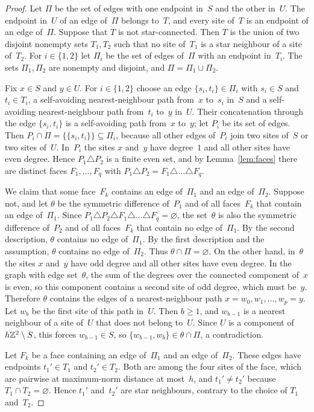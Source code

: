 \documentclass[11pt,letterpaper]{article}
\begin{document}
\begin{proof}
Let $\Pi$ be the set of edges with one endpoint in~$S$ and the other in~$U$. The endpoint in~$U$ of an edge of~$\Pi$ belongs to~$T$, and every site of~$T$ is an endpoint of an edge of~$\Pi$. Suppose that $T$ is not star-connected. Then $T$ is the union of two disjoint nonempty sets $T_1,T_2$ such that no site of~$T_1$ is a star neighbour of a site of~$T_2$. For $i\in\{1,2\}$ let $\Pi_i$ be the set of edges of~$\Pi$ with an endpoint in~$T_i$. The sets $\Pi_1,\Pi_2$ are nonempty and disjoint, and $\Pi=\Pi_1\cup\Pi_2$.

Fix $x\in S$ and $y\in U$. For $i\in\{1,2\}$ choose an edge $\{s_i,t_i\}\in\Pi_i$ with $s_i\in S$ and $t_i\in T_i$, a self-avoiding nearest-neighbour path from~$x$ to~$s_i$ in~$S$ and a self-avoiding nearest-neighbour path from~$t_i$ to~$y$ in~$U$. Their concatenation through the edge $\{s_i,t_i\}$ is a self-avoiding path from~$x$ to~$y$; let $P_i$ be its set of edges. Then $P_i\cap\Pi=\{\{s_i,t_i\}\}\subseteq\Pi_i$, because all other edges of~$P_i$ join two sites of~$S$ or two sites of~$U$. In~$P_i$ the sites $x$ and~$y$ have degree~$1$ and all other sites have even degree. Hence $P_1\triangle P_2$ is a finite even set, and by Lemma~\ref{lem:faces} there are distinct faces $F_1,\dots,F_q$ with $P_1\triangle P_2=F_1\triangle\dots\triangle F_q$.

We claim that some face~$F_k$ contains an edge of~$\Pi_1$ and an edge of~$\Pi_2$. Suppose not, and let $\theta$ be the symmetric difference of~$P_1$ and of all faces~$F_k$ that contain an edge of~$\Pi_1$. Since $P_1\triangle P_2\triangle F_1\triangle\dots\triangle F_q=\varnothing$, the set~$\theta$ is also the symmetric difference of~$P_2$ and of all faces~$F_k$ that contain no edge of~$\Pi_1$. By the second description, $\theta$ contains no edge of~$\Pi_1$. By the first description and the assumption, $\theta$ contains no edge of~$\Pi_2$. Thus $\theta\cap\Pi=\varnothing$. On the other hand, in~$\theta$ the sites $x$ and~$y$ have odd degree and all other sites have even degree. In the graph with edge set~$\theta$, the sum of the degrees over the connected component of~$x$ is even, so this component contains a second site of odd degree, which must be~$y$. Therefore $\theta$ contains the edges of a nearest-neighbour path $x=w_0,w_1,\dots,w_p=y$. Let $w_b$ be the first site of this path in~$U$. Then $b\ge1$, and $w_{b-1}$ is a nearest neighbour of a site of~$U$ that does not belong to~$U$. Since $U$ is a component of $h\mathbb Z^2\setminus S$, this forces $w_{b-1}\in S$, so $\{w_{b-1},w_b\}\in\theta\cap\Pi$, a contradiction.

Let $F_k$ be a face containing an edge of~$\Pi_1$ and an edge of~$\Pi_2$. These edges have endpoints $t_1'\in T_1$ and $t_2'\in T_2$. Both are among the four sites of the face, which are pairwise at maximum-norm distance at most~$h$, and $t_1'\neq t_2'$ because $T_1\cap T_2=\varnothing$. Hence $t_1'$ and~$t_2'$ are star neighbours, contrary to the choice of $T_1$ and~$T_2$.
\end{proof}
\end{document}
